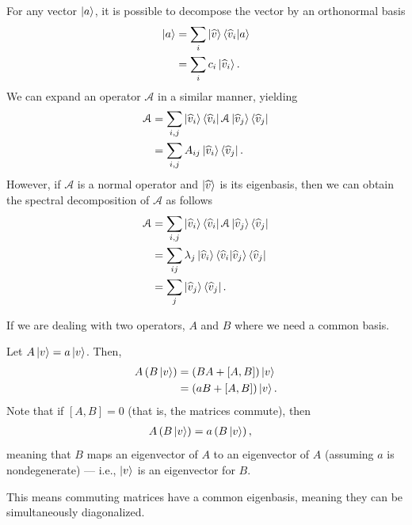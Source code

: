 \documentclass[10pt]{mypackage}
\begin{document}
\begin{example}
  For any vector $\ket{a}$, it is possible to decompose the vector by an orthonormal basis
  \begin{align*}
    \ket{a} &= \sum_{i}\ket{\widehat{v}}\braket{\widehat{v}_i}{a}\\
            &= \sum_{i}c_i\ket{\widehat{v}_i}.
  \end{align*}
  We can expand an operator $\mathcal{A}$ in a similar manner, yielding
  \begin{align*}
    \mathcal{A} &= \sum_{i,j}\ket{\widehat{v}_i}\bra{\widehat{v}_i}\mathcal{A}\ket{\widehat{v}_j}\bra{\widehat{v}_j}\\
                &= \sum_{i,j}A_{ij}\ket{\widehat{v}_i}\bra{\widehat{v}_j}.
  \end{align*}
  However, if $\mathcal{A}$ is a normal operator and $\ket{\widehat{v}}$ is its eigenbasis, then we can obtain the spectral decomposition of $\mathcal{A}$ as follows
  \begin{align*}
    \mathcal{A} &= \sum_{i,j}\ket{\widehat{v}_i}\bra{\widehat{v}_i}\mathcal{A}\ket{\widehat{v}_j}\bra{\widehat{v}_j}\\
                &= \sum_{ij}\lambda_{j}\ket{\widehat{v}_i}\braket{\widehat{v}_i}{\widehat{v}_j}\bra{\widehat{v}_j}\\
                &= \sum_{j}\ket{\widehat{v}_j}\bra{\widehat{v}_j}.
  \end{align*}
  
\end{example}
If we are dealing with two operators, $A$ and $B$ where we need a common basis.\newline

Let $A \ket{v} = a\ket{v}$. Then,
\begin{align*}
  A\left(B\ket{v}\right) &= \left(BA + \left[A,B\right]\right)\ket{v}\\
                         &= \left(aB + \left[A,B\right]\right)\ket{v}.
\end{align*}
Note that if $\left[A,B\right] = 0$ (that is, the matrices commute), then
\begin{align*}
  A\left(B\ket{v}\right) &= a\left(B\ket{v}\right),
\end{align*}
meaning that $B$ maps an eigenvector of $A$ to an eigenvector of $A$ (assuming $a$ is nondegenerate) --- i.e., $\ket{v}$ is an eigenvector for $B$.\newline

This means commuting matrices have a common eigenbasis, meaning they can be simultaneously diagonalized.\newline
\end{document}
